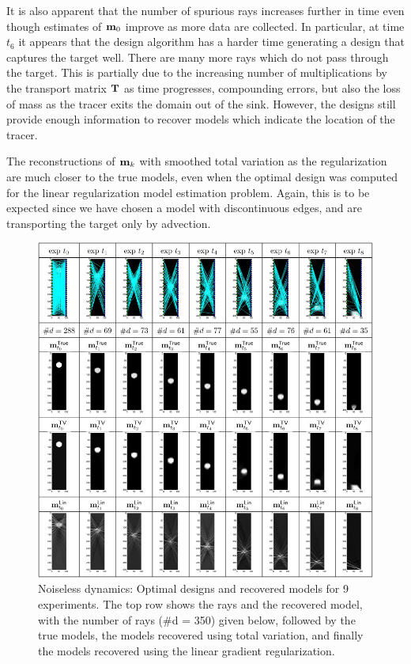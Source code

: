 \documentclass[leqno,onefignum,onetabnum]{siamltexmm}
\newcommand{\bfT}	{{\bf{T}}}
\newcommand{\bfm}	{{\bf{m}}}
\begin{document}
It is also apparent that the number of spurious rays increases further in time even though estimates of $\bfm_0$ improve as more data are collected. In particular, at time $t_6$ it appears that the design algorithm has a harder time generating a design that captures the target well. There are many more rays which do not pass through the target. This is partially due to the increasing number of multiplications by the transport matrix $\bfT$ as time progresses, compounding errors, but also the loss of mass as the tracer exits the domain out of the sink. However, the designs still provide enough information to recover models which indicate the location of the tracer.  

The reconstructions of $\bfm_k$ with smoothed total variation as the regularization are much closer to the true models, even when the optimal design was computed for the linear regularization model estimation problem. Again, this is to be expected since we have chosen a model with discontinuous edges, and are transporting the target only by advection. 
\begin{figure}[!h]
	\begin{center}
	\iwidth=155mm
	\includegraphics[width = 1\iwidth]{figures/noiselessFigs/noiselessResults}
	\end{center}
	\caption{Noiseless dynamics: Optimal designs and recovered models for 9 	experiments. The top row shows the rays and the recovered model, with 		the number of rays (\#d = 350) given below, followed by the true 			models, the models recovered using total variation, and finally the 		models recovered using the linear gradient regularization.}
	\label{fig:results1}
\end{figure}
\end{document}
